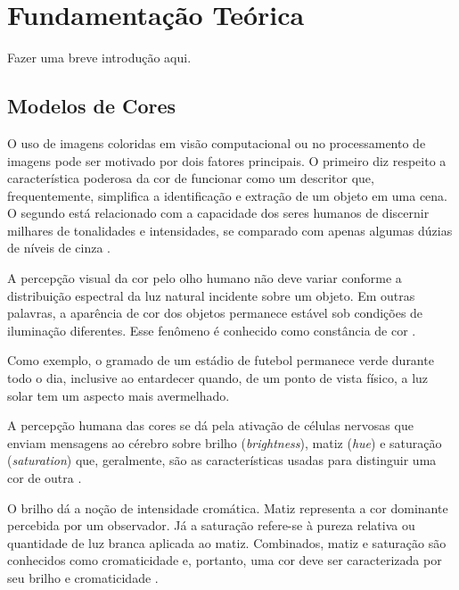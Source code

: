 \chapter{Fundamentação Teórica}
\label{cap:conceitos}

{\color{red} Fazer uma breve introdução aqui.}

\section{Modelos de Cores}
\label{sec:fundamentos}

O uso de imagens coloridas em visão computacional ou no processamento de imagens pode ser motivado por dois fatores principais. O primeiro diz respeito a característica poderosa da cor de funcionar como um descritor que, frequentemente, simplifica a identificação e extração de um objeto em uma cena. O segundo está relacionado com a capacidade dos seres humanos de discernir milhares de tonalidades e intensidades, se comparado com apenas algumas dúzias de níveis de cinza \citep{gonzalez:02}.

A percepção visual da cor pelo olho humano não deve variar conforme a distribuição espectral da luz natural incidente sobre um objeto. Em outras palavras, a aparência de cor dos objetos permanece estável sob condições de iluminação diferentes. Esse fenômeno é conhecido como constância de cor \citep{gevers:12}.

Como exemplo, o gramado de um estádio de futebol permanece verde durante todo o dia, inclusive ao entardecer quando, de um ponto de vista físico, a luz solar
tem um aspecto mais avermelhado.

A percepção humana das cores se dá pela ativação de células nervosas que enviam
mensagens ao cérebro sobre brilho (\textit{brightness}), matiz (\textit{hue}) e 
saturação (\textit{saturation}) que, geralmente, são as características usadas
para distinguir uma cor de outra \citep{gonzalez:02}.

O brilho dá a noção de intensidade cromática. Matiz representa a cor dominante
percebida por um observador. Já a saturação refere-se à pureza relativa ou quantidade de luz branca aplicada ao matiz. Combinados, matiz e saturação são conhecidos como cromaticidade e, portanto, uma cor deve ser caracterizada por seu brilho e cromaticidade \citep{gonzalez:02}.

